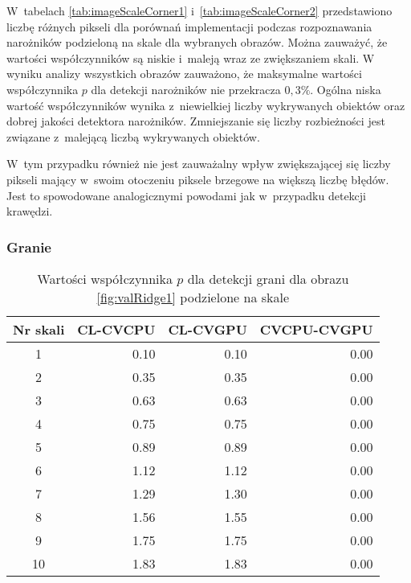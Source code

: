 W~tabelach \ref{tab:imageScaleCorner1} i~\ref{tab:imageScaleCorner2} przedstawiono liczbę różnych pikseli dla porównań implementacji podczas rozpoznawania narożników podzieloną na skale dla wybranych obrazów. Można zauważyć, że wartości współczynników są niskie i~maleją wraz ze zwiększaniem skali. W wyniku analizy wszystkich obrazów zauważono, że maksymalne wartości współczynnika $ p $ dla detekcji narożników nie przekracza $ 0,3 \% $. Ogólna niska wartość współczynników wynika z~niewielkiej liczby wykrywanych obiektów oraz dobrej jakości detektora narożników. Zmniejszanie się liczby rozbieżności jest związane z~malejącą liczbą wykrywanych obiektów.

W~tym przypadku również nie jest zauważalny wpływ zwiększającej się liczby pikseli mający w~swoim otoczeniu piksele brzegowe na większą liczbę błędów. Jest to spowodowane analogicznymi powodami jak w~przypadku detekcji krawędzi.


\subsubsection{Granie}
\label{subsubsec:granieTabele}

\begin{center}
\begin{table}
\centering
\caption{Wartości współczynnika $ p $ dla detekcji grani dla obrazu \ref{fig:valRidge1} podzielone na skale}
\label{tab:imageScaleRidge1}
\begin{tabular}{|c|r|r|r|}
 \hline
Nr skali & CL-CVCPU & CL-CVGPU & CVCPU-CVGPU \\ \hline
1        & 0.10     & 0.10     & 0.00        \\ \hline
2        & 0.35     & 0.35     & 0.00        \\ \hline
3        & 0.63     & 0.63     & 0.00        \\ \hline
4        & 0.75     & 0.75     & 0.00        \\ \hline
5        & 0.89     & 0.89     & 0.00        \\ \hline
6        & 1.12     & 1.12     & 0.00        \\ \hline
7        & 1.29     & 1.30     & 0.00        \\ \hline
8        & 1.56     & 1.55     & 0.00        \\ \hline
9        & 1.75     & 1.75     & 0.00        \\ \hline
10       & 1.83     & 1.83     & 0.00        \\ \hline
\end{tabular}
\end{table}
\end{center}


